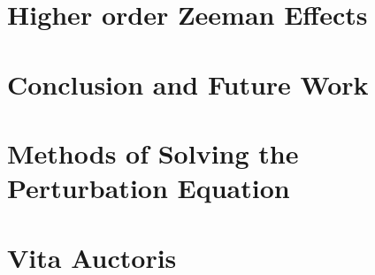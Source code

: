 \documentclass[a4paper,12pt,twoside]{report}
\begin{document}
\chapter{Higher order Zeeman Effects}

\chapter{Conclusion and Future Work}

\appendix

\chapter{Methods of Solving the Perturbation Equation}
\chapter{Vita Auctoris}




\end{document}
